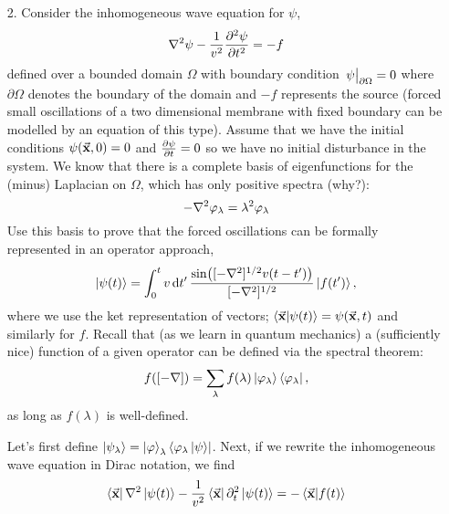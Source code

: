 \documentclass[a4paper,twoside]{article}
\begin{document}
\begin{itemize}
\begin{problem}
        \end{problem}
\pagebreak
    \item[2.] Consider the inhomogeneous wave equation for $ \psi $,
        \begin{equation}
            \laplacian{\psi} - \frac{1}{v^2} \pdv[2]{\psi}{t} = -f
        \end{equation}
        defined over a bounded domain $ \Omega $ with boundary condition $ \eval{\psi}_{\partial \Omega} = 0 $ where $ \partial \Omega $ denotes the boundary of the domain and $ -f $ represents the source (forced small oscillations of a two dimensional membrane with fixed boundary can be modelled by an equation of this type). Assume that we have
        the initial conditions $ \psi( \va{x}, 0) = 0 $ and $ \pdv{\psi}{t}( \va{x}, 0) = 0 $ so we have no initial disturbance in the system. We know that there is a complete basis of eigenfunctions for the (minus) Laplacian on $ \Omega $, which has only positive spectra (why?):
        \begin{equation}
            - \laplacian{\varphi_{\lambda}} = \lambda^2 \varphi_{\lambda}
        \end{equation}
        Use this basis to prove that the forced oscillations can be formally represented in an operator approach,
        \begin{equation}
            \ket{\psi(t)} = \int_0^t v \dd{t'} \frac{\sin([- \laplacian]^{1/2} v (t-t'))}{[-\laplacian]^{1/2}}\ket{f(t')},
        \end{equation}
        where we use the ket representation of vectors; $\bra{ \va{x}}\ket{\psi(t)} = \psi( \va{x}, t) $ and similarly for $ f $. Recall that (as we learn in quantum mechanics) a (sufficiently nice) function of a given operator can be defined via the spectral theorem:
        \begin{equation}
            f([-\nabla]) = \sum_{\lambda} f(\lambda)\ket{\varphi_{\lambda}}\bra{\varphi_{\lambda}},
        \end{equation}
        as long as $ f(\lambda) $ is well-defined.
        \begin{problem}
            Let's first define $\ket{\psi_{\lambda}} =\ket{\varphi}_{\lambda}\bra{\varphi_{\lambda}\ket{\psi}} $. Next, if we rewrite the inhomogeneous wave equation in Dirac notation, we find
            \begin{equation}
                \bra{ \va{x}} \laplacian \ket{\psi(t)} - \frac{1}{v^2}\bra{ \va{x}} \partial_t^2\ket{\psi(t)} = -\bra{ \va{x}}\ket{f(t)} 
            \end{equation}

\end{problem}
\end{itemize}
\end{document}
